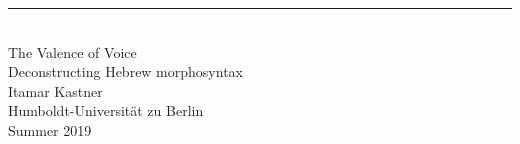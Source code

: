 \singlespacing
\begin{center}
\rule{165pt}{0pt} \\
\vspace{1cm}
\LARGE{The Valence of Voice}\\
\vspace{1cm}
\Large{Deconstructing Hebrew morphosyntax}\\
\vspace{2cm}
\large{Itamar Kastner} \\
\vspace{0.4cm}
\normalsize{Humboldt-Universit\"at zu Berlin} \\
\vspace{1cm}
\normalsize{Summer 2019} %

\end{center}
